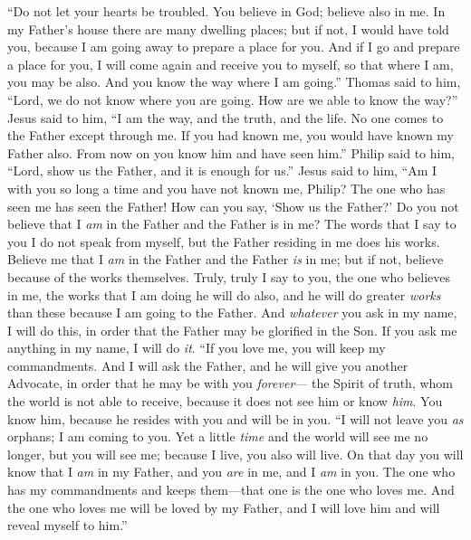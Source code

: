 \begin{biblechapter} %
 “Do not let your hearts be troubled. You believe in God; believe also in me.
\verse In my Father’s house there are many dwelling places; but if not, I would have told you, because I am going away to prepare a place for you.
\verse And if I go and prepare a place for you, I will come again and receive you to myself, so that where I am, you may be also.
\verse And you know the way where I am going.”
\verse Thomas said to him, “Lord, we do not know where you are going. How are we able to know the way?”
\verse Jesus said to him, “I am the way, and the truth, and the life. No one comes to the Father except through me.
\verse If you had known me, you would have known my Father also. From now on you know him and have seen him.”
\verse Philip said to him, “Lord, show us the Father, and it is enough for us.”
\verse Jesus said to him, “Am I with you so long a time and you have not known me, Philip? The one who has seen me has seen the Father! How can you say, ‘Show us the Father?’
\verse Do you not believe that I \textit{am} in the Father and the Father is in me? The words that I say to you I do not speak from myself, but the Father residing in me does his works.
\verse Believe me that I \textit{am} in the Father and the Father \textit{is} in me; but if not, believe because of the works themselves.
\verse Truly, truly I say to you, the one who believes in me, the works that I am doing he will do also, and he will do greater \textit{works} than these because I am going to the Father.
\verse And \textit{whatever} you ask in my name, I will do this, in order that the Father may be glorified in the Son.
\verse If you ask me anything in my name, I will do \textit{it}.
 “If you love me, you will keep my commandments.
\verse And I will ask the Father, and he will give you another Advocate, in order that he may be with you \textit{forever}—
\verse the Spirit of truth, whom the world is not able to receive, because it does not see him or know \textit{him}. You know him, because he resides with you and will be in you.
\verse “I will not leave you \textit{as} orphans; I am coming to you.
\verse Yet a little \textit{time} and the world will see me no longer, but you will see me; because I live, you also will live.
\verse On that day you will know that I \textit{am} in my Father, and you \textit{are} in me, and I \textit{am} in you.
\verse The one who has my commandments and keeps them—that one is the one who loves me. And the one who loves me will be loved by my Father, and I will love him and will reveal myself to him.”

\end{biblechapter}
